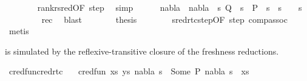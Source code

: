 \begin{isabellebody}
\ \ \ \ \ \ \isamarkupfalse%
\ rank{\isacharunderscore}{\kern0pt}r{\isacharunderscore}{\kern0pt}sred{\isacharbrackleft}{\kern0pt}OF\ step{\isacharbrackright}{\kern0pt}\ \isamarkupfalse%
\ simp\isanewline
\ \ \ \ \isamarkupfalse%
\ {\isachardoublequoteopen}nabla{\isacharprime}{\kern0pt}\ {\isacharequal}{\kern0pt}\ nabla\ {\isasymand}\ {\isacharparenleft}{\kern0pt}{\isasymexists}s{}{\isachardot}{\kern0pt}\ Q\ {\isasymturnstile}\ s{}\ {\isasymleadsto}\isactrlsup {\isacharasterisk}{\kern0pt}\ P{\isacharprime}{\kern0pt}\ {\isasymand}\ s{\isacharprime}{\kern0pt}\ {\isacharequal}{\kern0pt}\ s{}\ {\isasymbullet}\ {\isacharparenleft}{\kern0pt}{\isasymsigma}\ {\isasymbullet}\ s{\isacharparenright}{\kern0pt}{\isacharparenright}{\kern0pt}{\isachardoublequoteclose}\isanewline
\ \ \ \ \ \ \isamarkupfalse%
\ {}{\isacharparenleft}{\kern0pt}{}{\isacharparenright}{\kern0pt}\ rec\ \isamarkupfalse%
\ blast\isanewline
\ \ \ \ \isamarkupfalse%
\ \isamarkupfalse%
\ {\isacharquery}{\kern0pt}thesis\isanewline
\ \ \ \ \ \ \isamarkupfalse%
\ sred{\isacharunderscore}{\kern0pt}rtc{\isacharunderscore}{\kern0pt}step{\isacharbrackleft}{\kern0pt}OF\ step{\isacharbrackright}{\kern0pt}\ comp{\isacharunderscore}{\kern0pt}assoc\ \isamarkupfalse%
\ metis\isanewline
\ \ \isamarkupfalse%
\isanewline
{}\isamarkupfalse%
%
\endisatagproof
{\isafoldproof}%
%
\isadelimproof
%
\endisadelimproof
%
\begin{isamarkuptext}%
 is simulated by the reflexive-transitive closure of the freshness reductions.%
\end{isamarkuptext}\isamarkuptrue%
\isamarkupfalse%
\ cred{\isacharunderscore}{\kern0pt}fun{\isacharunderscore}{\kern0pt}cred{\isacharunderscore}{\kern0pt}rtc{\isacharcolon}{\kern0pt}\isanewline
\ \ \ {\isachardoublequoteopen}cred{\isacharunderscore}{\kern0pt}fun\ {\isacharparenleft}{\kern0pt}{\isacharparenleft}{\kern0pt}xs{\isacharcomma}{\kern0pt}\ ys{\isacharparenright}{\kern0pt}{\isacharcomma}{\kern0pt}\ nabla{\isacharcomma}{\kern0pt}\ s{\isacharparenright}{\kern0pt}\ {\isacharequal}{\kern0pt}\ Some\ {\isacharparenleft}{\kern0pt}P{\isacharprime}{\kern0pt}{\isacharcomma}{\kern0pt}\ nabla{\isacharprime}{\kern0pt}{\isacharcomma}{\kern0pt}\ s{\isacharprime}{\kern0pt}{\isacharparenright}{\kern0pt}{\isachardoublequoteclose}\ \ {\isachardoublequoteopen}xs\ {\isacharequal}{\kern0pt}\ {\isacharbrackleft}{\kern0pt}{\isacharbrackright}{\kern0pt}{\isachardoublequoteclose}\isanewline

\end{isabellebody}
